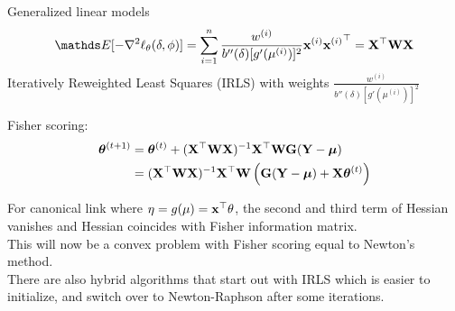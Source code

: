 \documentclass[11pt,compress,t,notes=noshow, xcolor=table]{beamer}
\begin{document}
\begin{vbframe}{Generalized linear models}
$$\E[-\nabla^2 \logl_{\theta}(\delta, \phi)] = \sumin \frac{w^{(i)}}{b''(\delta)[g'(\mu^{(i)})]^2}\xv^{(i)}{\xv^{(i)}}^\top = \mathbf{X}^\top \mathbf{W} \mathbf{X}$$
\lz
Iteratively Reweighted Least Squares (IRLS) with weights $\frac{w^{(i)}}{b''(\delta)[g'(\mu^{(i)})]^2}$\\

\framebreak

Fisher scoring:
\begin{align*}
\bm{\theta}^{(t+1)} &=\bm{\theta}^{(t)} + (\mathbf{X}^\top \mathbf{W} \mathbf{X})^{-1}\mathbf{X}^\top \mathbf{W} \mathbf{G} (\mathbf{Y}-\bm{\mu})\\
& =(\mathbf{X}^\top \mathbf{W} \mathbf{X})^{-1}\mathbf{X}^\top \mathbf{W} \left(\mathbf{G} (\mathbf{Y}-\bm{\mu})+\mathbf{X}\bm{\theta}^{(t)}\right)
\end{align*}

\lz

For canonical link where $\eta = g(\mu) = \mathbf{x}^\top\theta$, the second and third term of Hessian vanishes and Hessian coincides with Fisher information matrix.\\
\lz
This will now be a convex problem with Fisher scoring equal to Newton's method.\\
\lz
There are also hybrid algorithms that start out with IRLS which is easier to initialize, and switch over to Newton-Raphson after some iterations.

\end{vbframe}

\endlecture
\end{document}
